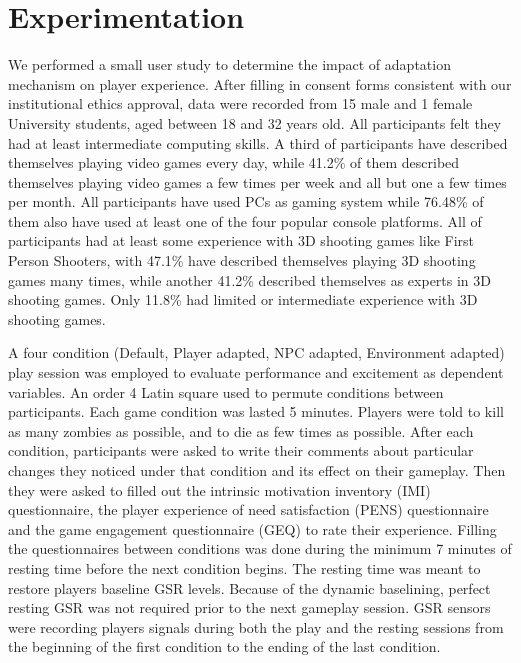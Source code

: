 \documentclass[conference]{IEEEtran}
\begin{document}

\section{Experimentation}
\label{sec:exprm}

We performed a small user study to determine the impact of adaptation mechanism on player experience. After filling in consent forms consistent with our institutional ethics approval, data were recorded from 15 male and 1 female University students, aged between 18 and 32 years old. All participants felt they had at least intermediate computing skills. A third of participants have described themselves playing video games every day, while 41.2\% of them described themselves playing video games a few times per week and all but one a few times per month. All participants have used PCs as gaming system while 76.48\% of them also have used at least one of the four popular console platforms. All of participants had at least some experience with 3D shooting games like First Person Shooters, with 47.1\% have described themselves playing 3D shooting games many times, while another 41.2\% described themselves as experts in 3D shooting games. Only 11.8\% had limited or intermediate experience with 3D shooting games. 

A four condition (Default, Player adapted, NPC adapted, Environment adapted) play session was employed to evaluate performance and excitement as dependent variables. An order 4 Latin square used to permute conditions between participants. Each game condition was lasted 5 minutes. Players were told to kill as many zombies as possible, and to die as few times as possible. After each condition, participants were asked to write their comments about particular changes they noticed under that condition and its effect on their gameplay. Then they were asked to filled out the intrinsic motivation inventory (IMI) questionnaire, the player experience of need satisfaction (PENS) questionnaire and the game engagement questionnaire (GEQ) to rate their experience. Filling the questionnaires between conditions was done during the minimum 7 minutes of resting time before the next condition begins. The resting time was meant to restore players baseline GSR levels. Because of the dynamic baselining, perfect resting GSR was not required prior to the next gameplay session. GSR sensors were recording players signals during both the play and the resting sessions from the beginning of the first condition to the ending of the last condition.
\end{document}
